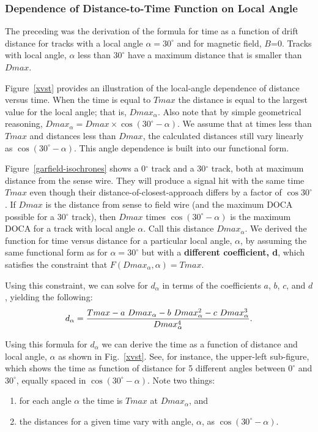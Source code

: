 \subsubsection{Dependence of Distance-to-Time Function on Local Angle}

The preceding was the derivation of the formula for time as a function
of drift distance for tracks with a local angle $\alpha = 30^\circ$ and for magnetic field, $B$=0.
Tracks with local angle, $\alpha$ less than $30^\circ$ have a maximum distance that is
smaller than $Dmax$.  

Figure~\ref{xvst} provides an illustration of the local-angle dependence
of distance versus time.  When the time is equal to $Tmax$ the distance is equal to
the largest value for the local angle; that is, $Dmax_{\alpha}$.  Also note that by
simple geometrical reasoning, $Dmax_{\alpha} = Dmax \times \cos(30^\circ-\alpha)$.
We assume that at times less than $Tmax$ and distances less than $Dmax$, the calculated
distances still vary linearly as $\cos(30^\circ-\alpha)$.  This angle dependence is built into
our functional form.

Figure~\ref{garfield-isochrones} shows a 0$^\circ$ track and a 30$^\circ$ track, both at maximum
distance from the sense wire. They will produce
a signal hit with the same time $Tmax$ even though their distance-of-closest-approach 
differs by a factor of $\cos 30^\circ$.  If $Dmax$ is the distance from sense to field wire (and the maximum
DOCA possible for a 30$^\circ$ track), then $Dmax$ times $\cos(30^\circ-\alpha)$ is the maximum
DOCA for a track with local angle $\alpha$.  Call this distance $Dmax_{\alpha}$.  
We derived the function for time versus distance for a particular local angle, $\alpha$, by
assuming the same functional form as for $\alpha = 30^\circ$ but 
with a {\bf different coefficient, d}, which 
satisfies the constraint that  $F(Dmax_{\alpha},\alpha) = Tmax$.

Using this constraint, we can solve for $d_{\alpha}$ in terms of the coefficients $a$, $b$, $c$, and $d$,
yielding the following:
\begin{equation}
\label{aalphaequation}
d_{\alpha} = {{Tmax - a ~Dmax_{\alpha} - b ~Dmax_{\alpha}^2 - c ~Dmax_{\alpha}^3}\over{Dmax_{\alpha}^4}}.
\end{equation}

Using this formula for $d_{\alpha}$ we can derive the time as a function of distance and local
angle, $\alpha$ as shown in Fig.~\ref{xvst}.  See, for instance, the upper-left sub-figure, 
which shows the time as function of distance for 5 different angles between $0^\circ$ and 
$30^\circ$, equally spaced in $\cos (30^\circ-\alpha)$.  Note two things:
\begin{enumerate}
\item for each angle $\alpha$ the time is $Tmax$ at $Dmax_{\alpha}$, and
\item the distances for a given time vary with angle, $\alpha$, as $\cos (30^\circ-\alpha)$.
\end{enumerate}

